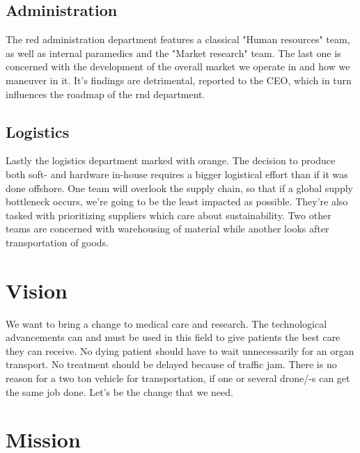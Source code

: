 \subsection{Administration}
The red administration department features a classical "Human resources" team, as well as internal paramedics and the "Market research" team. The last one is concerned with the development of the overall market we operate in and how we maneuver in it. It's findings are detrimental, reported to the CEO, which in turn influences the roadmap of the \ac{rnd} department.
\subsection{Logistics}\label{org-logistics}
Lastly the logistics department marked with orange. The decision to produce both soft- and hardware in-house requires a bigger logistical effort than if it was done offshore. One team will overlook the supply chain, so that if a global supply bottleneck occurs, we're going to be the least impacted as possible. They're also tasked with prioritizing suppliers which care about sustainability. Two other teams are concerned with warehousing of material while another looks after transportation of goods.
\section{Vision}
\begin{quote}
\end{quote}

We want to bring a change to medical care and research. The technological advancements can and must be used in this field to give patients the best care they can receive. No dying patient should have to wait unnecessarily for an organ transport. No treatment should be delayed because of traffic jam. There is no reason for a two ton vehicle for transportation, if one or several drone/-s can get the same job done.
\newline
\newline
Let's be the change that we need.

\section{Mission}
\begin{quote}
\end{quote}

